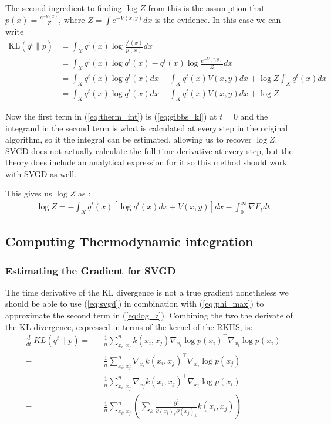 \documentclass{article}
\begin{document}
    The second ingredient to finding $\log Z$ from this is the assumption that $p(x) = \frac{ e^{-V(x)} }{ Z }$, 
    where $Z = \int e^{-V(x, y)} dx$ is the evidence. In this case we can write
    \begin{align}
    \label{eq:gibbs_kl}
        \text{KL}( q^t \| p ) &= \int_X q^t(x) \log \frac{ q^t(x) }{ p(x) } dx \\
                        &= \int_X q^t(x) \log q^t(x) - q^t(x) \log \frac{ e^{-V(x, y)} }{ Z } dx \\
                        &= \int_X q^t(x) \log q^t(x) dx + \int_X q^t(x) V(x, y) dx + \log Z \int_X q^t(x) dx \\
                        &= \int_X q^t(x) \log q^t(x) dx + \int_X q^t(x) V(x, y) dx + \log Z
    \end{align}

    Now the first term in (\ref{eq:therm_int}) is (\ref{eq:gibbs_kl}) at $t=0$ and the integrand in the second term is
    what is calculated at every step in the original algorithm, so it the integral can be estimated, allowing us to 
    recover $\log Z$. SVGD does not actually calculate the full time derivative at every step, but the theory does 
    include an analytical expression for it so this method should work with SVGD as well.

    This gives us $\log Z$ as :
    \begin{align}
    \label{eq:log_z}
        \log Z = - \int_X q^t(x) [\log q^t(x) dx +  V(x, y)] dx 
            - \int_0^\infty \nabla F_t dt
    \end{align}


    \newpage

\subsection{Computing Thermodynamic integration}
\subsubsection{Estimating the Gradient for SVGD}
    The time derivative of the KL divergence is not a true gradient nonetheless we should be able to use
    (\ref{eq:svgd}) in combination with (\ref{eq:phi_max}) to approximate the second term in (\ref{eq:log_z}).
    Combining the two the derivate of the KL divergence, expressed in terms of the kernel of the RKHS, is:
    \begin{align}
        \label{eq:F_approximation}
        \frac{d}{dt}\ KL( q^t \| p ) = -& \frac{1}{n}\sum_{x_i,x_j}^n  k(x_i,x_j) \nabla_{x_i} \log p(x_i)^\top \nabla_{x_i} \log p(x_i)  \\ 
        -& \frac{1}{n}\sum_{x_i,x_j}^n  \nabla_{x_i} k(x_i,x_j)^\top \nabla_{x_j} \log p(x_j)  \\ 
        -& \frac{1}{n}\sum_{x_i,x_j}^n  \nabla_{x_j} k(x_i,x_j)^\top \nabla_{x_i} \log p(x_i)  \\ 
        -& \frac{1}{n}\sum_{x_i,x_j}^n \left( \sum_k \frac{ \partial^2 }{ \partial (x_i)_k \partial (x_j)_k } 
            k(x_i,x_j) \right)
    \end{align}
\end{document}
